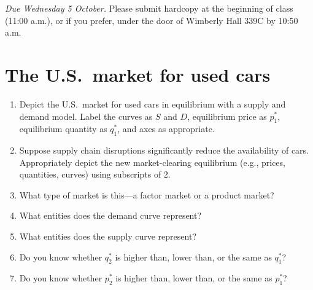 \documentclass{assignment}
\date{Friday 30 September 2022}
\begin{document}
\RaggedRight

\beginassignment{}

\emph{Due Wednesday 5 October.} Please submit hardcopy at the beginning of class (11:00 a.m.), or if you prefer, under the door of Wimberly Hall 339C by 10:50 a.m.

\section{The U.S.~market for used cars}

\begin{center}
\vspace{18pt}
\end{center}

\begin{enumerate}

\item Depict the U.S.~market for used cars in equilibrium with a supply and demand model. Label the curves as $S$ and $D$, equilibrium price as $p^*_1$, equilibrium quantity as $q^*_1$, and axes as appropriate.

\item Suppose supply chain disruptions significantly reduce the availability of cars. Appropriately depict the new market-clearing equilibrium (e.g., prices, quantities, curves) using subscripts of 2.

\item What type of market is this---a factor market or a product market?

\vfill

\item What entities does the demand curve represent?

\vfill

\vspace{-1\baselineskip}
\clearpage

\item What entities does the supply curve represent?

\vfill

\item Do you know whether $q^*_2$ is higher than, lower than, or the same as $q^*_1$?

\vfill

\item Do you know whether $p^*_2$ is higher than, lower than, or the same as $p^*_1$?

\vfill

\end{enumerate}
\end{document}
